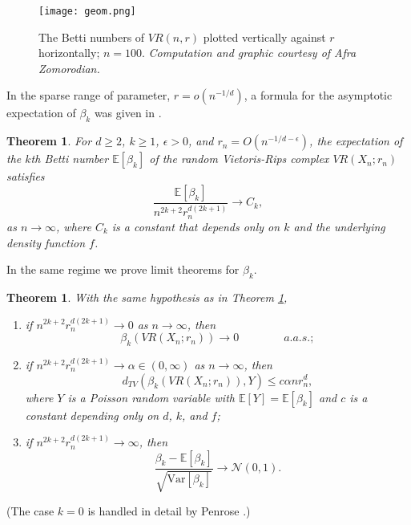 \documentclass{amsart}
\newtheorem{theorem}[thm]{Theorem}
\theoremstyle{definition}
\newcommand{\E}{\mathbb{E}}
\newcommand{\var}{\mathrm{Var}}
\renewcommand{\1}{\mathbb{1}}
\begin{document}
\begin{figure}\label{VR-fig}
\begin{centering}
\texttt{[image: geom.png]}
\end{centering}
\caption{The Betti numbers of $VR(n,r)$ plotted vertically against $r$
  horizontally; $n=100$. \emph{Computation and graphic courtesy of
    Afra Zomorodian.}}
\label{fig:geom}
\end{figure}

In the sparse range of parameter, $r = o(n^{-1/d})$, a formula for the
asymptotic expectation of $\beta_k$ was given in \cite{geometric}.

\begin{theorem} \label{exp_rips} 
For $d \ge 2$, $k \ge 1$, $\epsilon>0$, and $r _n = O(n^{-1/d -
  \epsilon})$, the expectation of the $k$th Betti number $\E[\beta_k]$
of the random Vietoris-Rips complex $VR(X_n;r_n)$ satisfies $$
\frac{\E[\beta_k]}{n^{2k+2} r_n^{d(2k+1)}} \to C_k,$$ as $n \to
\infty$, where $C_k$ is a constant that depends only on $k$ and the
underlying density function $f$.
\end{theorem}

In the same regime we prove limit theorems for 
$\beta_k$.

\begin{theorem} \label{clt_rips} 
With the same hypothesis as in Theorem \ref{exp_rips}, 
\begin{enumerate}

\item if $n^{2k+2} r_n^{d(2k+1)}\to0$ as $n\to\infty$, then 
$$\beta_k(VR(X_n;r_n))\to0\qquad\qquad a.a.s.;$$

\item if $n^{2k+2} r_n^{d(2k+1)}\to\alpha\in(0,\infty)$ as $n\to\infty$,
then 
$$d_{TV}(\beta_k(VR(X_n;r_n)),Y)\le c\alpha nr_n^d,$$
where $Y$ is a Poisson random variable with $\E[Y]=\E[\beta_k]$
and $c$ is a constant depending only on $d$, $k$, and $f$;

\item if $n^{2k+2} r_n^{d(2k+1)}\to\infty$, then 
$$ \frac{ \beta_k - \E[\beta_k] }{
  \sqrt{\var [ \beta_k]}} \to \mathcal{N}(0,1).$$

\end{enumerate}

\end{theorem}  



(The case $k=0$ is handled in detail by Penrose \cite{penrose}.)
\end{document}
